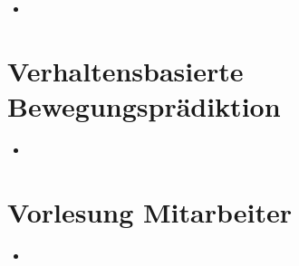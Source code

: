 \documentclass{report}
\begin{document}
	\begin{itemize}
		\item 
	\end{itemize}
	
	
	\section{Verhaltensbasierte Bewegungsprädiktion}
	
	\begin{itemize}
		\item 
	\end{itemize}
	
	
	\section{Vorlesung Mitarbeiter}
	
	\begin{itemize}
		\item 
	\end{itemize}
	
	
\end{document}
